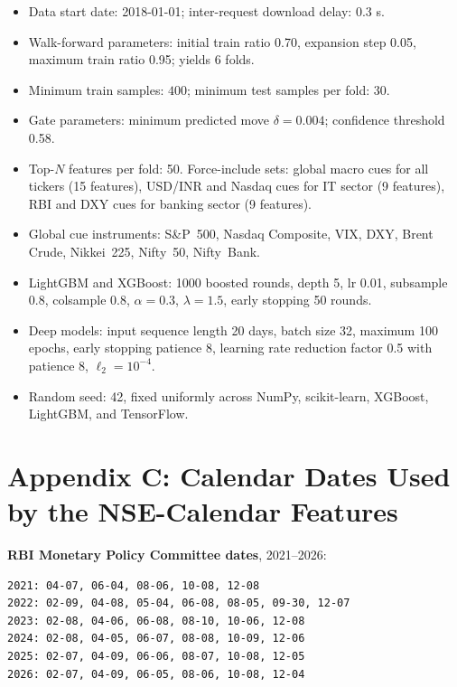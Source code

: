 \begin{itemize}
    \item Data start date: 2018-01-01; inter-request download delay: 0.3 s.
    \item Walk-forward parameters: initial train ratio 0.70, expansion step 0.05, maximum train ratio 0.95; yields 6 folds.
    \item Minimum train samples: \(400\); minimum test samples per fold: \(30\).
    \item Gate parameters: minimum predicted move $\delta = 0.004$; confidence threshold 0.58.
    \item Top-$N$ features per fold: 50. Force-include sets: global macro cues for all tickers (15 features), USD/INR and Nasdaq cues for IT sector (9 features), RBI and DXY cues for banking sector (9 features).
    \item Global cue instruments: S\&P~500, Nasdaq Composite, VIX, DXY, Brent Crude, Nikkei~225, Nifty~50, Nifty~Bank.
    \item LightGBM and XGBoost: 1000 boosted rounds, depth 5, lr 0.01, subsample 0.8, colsample 0.8, $\alpha=0.3$, $\lambda=1.5$, early stopping 50 rounds.
    \item Deep models: input sequence length 20 days, batch size 32, maximum 100 epochs, early stopping patience 8, learning rate reduction factor 0.5 with patience 8, $\ell_2 = 10^{-4}$.
    \item Random seed: 42, fixed uniformly across NumPy, scikit-learn, XGBoost, LightGBM, and TensorFlow.
\end{itemize}

\section*{Appendix C: Calendar Dates Used by the NSE-Calendar Features}

\textbf{RBI Monetary Policy Committee dates}, 2021--2026:

\begin{small}
\begin{verbatim}
2021: 04-07, 06-04, 08-06, 10-08, 12-08
2022: 02-09, 04-08, 05-04, 06-08, 08-05, 09-30, 12-07
2023: 02-08, 04-06, 06-08, 08-10, 10-06, 12-08
2024: 02-08, 04-05, 06-07, 08-08, 10-09, 12-06
2025: 02-07, 04-09, 06-06, 08-07, 10-08, 12-05
2026: 02-07, 04-09, 06-05, 08-06, 10-08, 12-04
\end{verbatim}
\end{small}

